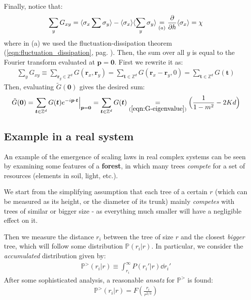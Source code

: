 \documentclass[../../main.tex]{subfiles}
\begin{document}
Finally, notice that:
\begin{align*}
    \sum_y G_{xy} = \langle \sigma_x \sum \sigma_y \rangle - \langle \sigma_x \rangle \langle \sum_y \sigma_y \rangle \underset{\substack{(a)}}{=}  \pdv{h} \langle \sigma_x \rangle = \chi
\end{align*}
where in (a) we used the fluctuation-dissipation theorem (\ref{eqn:fluctuation_dissipation}, pag. \pageref{eqn:fluctuation_dissipation}). Then, the sum over all $y$ is equal to the Fourier transform evaluated at $\bm{p} = \bm{0}$. First we rewrite it as:
\begin{align*}
    \sum_{y} G_{xy} \equiv \sum_{\bm{r}_y \in \mathbb{Z}^d} G(\bm{r}_x, \bm{r}_y) = \sum_{\bm{t} \in \mathbb{Z}^d} G(\bm{r}_x-\bm{r}_y, 0) = \sum_{\bm{t} \in \mathbb{Z}^d} G(\bm{t})
\end{align*}
Then, evaluating $\tilde{G}(\bm{0})$ gives the desired sum:
\begin{align*}
    \tilde{G}(\bm{0}) = \sum_{\bm{t} \in \mathbb{Z}^d} G(\bm{t}) e^{-i \bm{p} \cdot \bm{t}} \Big|_{\bm{p} = \bm{0}} = \sum_{\bm{t} \in \mathbb{Z}^d} G(\bm{t}) \underset{(\ref{eqn:G-eigenvalue})}{=}  \Big(\frac{1}{1-m^2} - 2 Kd\Big) 
\end{align*}

\subsection{Example in a real system}
An example of the emergence of scaling laws in real complex systems can be seen by examining some features of a \textbf{forest}, in which many trees \textit{compete} for a set of resources (elements in soil, light, etc.).

\medskip

We start from the simplifying assumption that each tree of a certain  $r$ (which can be measured as its height, or the diameter of its trunk) mainly \textit{competes} with trees of similar or bigger size - as everything much smaller will have a negligible effect on it.

Then we measure the distance $r_i$ between the tree of size $r$ and the closest \textit{bigger} tree, which will follow some distribution $\mathbb{P}(r_i|r)$. In particular, we consider the \textit{accumulated} distribution given by:
\begin{align*}
    \mathbb{P}^>(r_i|r) \equiv \int_{r_i}^\infty P(r_i'|r) \dd{r_i'}
\end{align*} 
After some sophisticated analysis, a reasonable \textit{ansatz} for $\mathbb{P}^>$ is found:
\begin{align}\label{eqn:tree-ansatz}
    \mathbb{P}^>(r_i|r) = F\left(\frac{r_i}{r^{2/3}} \right)
\end{align} 
\end{document}
